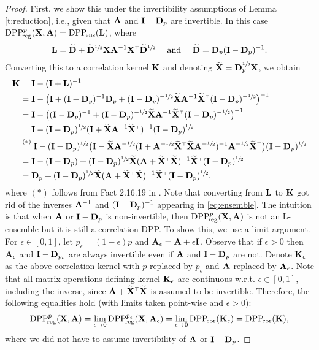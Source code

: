 \documentclass[11pt]{article}
\begin{document}
  \begin{proof}
    First, we show this under the invertibility assumptions of Lemma
    \ref{t:reduction}, i.e., given that $\mathbf A$ and $\mathbf I-\mathbf D_p$ are
    invertible. In this case ${{\mathrm{DPP}}_{\!\mathrm{reg}}^{p}}(\mathbf X,\mathbf A)={{\mathrm{DPP}}_{\!\mathrm{ens}}}(\mathbf{L})$, where
    \begin{align}\L=\Dbt+
    \Dbt^{\sfrac12}\X\A^{-1}\X^\top
      \Dbt^{\sfrac12}\quad\text{ and }\quad\Dbt=\D_p(\I-\D_p)^{-1}.\label{eq:ensemble}
\end{align}
Converting this to
    a correlation kernel $\mathbf K$ and denoting $\widetilde{\mathbf{X}}=\mathbf D_p^{\sfrac12}\mathbf X$, we obtain
    \begin{align*}
      \K&=\I-(\I+\L)^{-1}
\\      &=\I - \big(\I + (\I-\D_p)^{-1}\D_p +
(\I-\D_p)^{-\sfrac12}\Xt\A^{-1}\Xt^\top(\I-\D_p)^{-\sfrac12}\big)^{-1}
\\ &= \I - \big((\I-\D_p)^{-1} +
     (\I-\D_p)^{-\sfrac12}\Xt\A^{-1}\Xt^\top(\I-\D_p)^{-\sfrac12}\big)^{-1}
\\ &=\I -
     (\I-\D_p)^{\sfrac12}(\I+\Xt\A^{-1}\Xt^\top)^{-1}(\I-\D_p)^{\sfrac12}
      \\
      &\overset{(*)}{=}\I -
     (\I-\D_p)^{\sfrac12}\big(\I-\Xt\A^{-\sfrac12}
     (\I+\A^{-\sfrac12}\Xt^\top\Xt\A^{-\sfrac12})^{-1}
     \A^{-\sfrac12}\Xt^\top\big)(\I-\D_p)^{\sfrac12}
      \\
      &=\I - (\I-\D_p) +
     (\I-\D_p)^{\sfrac12}\Xt(\A+\Xt^\top\Xt)^{-1}\Xt^\top(\I-\D_p)^{\sfrac12}
\\ &=\D_p + (\I-\D_p)^{\sfrac12}\Xt(\A+\Xt^\top\Xt)^{-1}\Xt^\top(\I-\D_p)^{\sfrac12},
    \end{align*}
    where $(*)$ follows from Fact 2.16.19 in
    \cite{matrix-mathematics}. Note that converting from $\mathbf{L}$ to $\mathbf K$
    got rid of the inverses $\mathbf A^{-1}$  and $(\mathbf I-\mathbf D_p)^{-1}$ appearing
    in \eqref{eq:ensemble}. The intuition 
    is that when $\mathbf A$ or $\mathbf I-\mathbf D_p$ is non-invertible, then
    ${{\mathrm{DPP}}_{\!\mathrm{reg}}^{p}}(\mathbf X,\mathbf A)$ is not an L-ensemble but it is still a
    correlation DPP. To show this, we use a limit argument. For
    $\epsilon\in[0,1]$, let $p_\epsilon=(1-\epsilon)p$ and
    $\mathbf A_\epsilon=\mathbf A+\epsilon\mathbf I$. Observe that if $\epsilon>0$ then $\mathbf A_\epsilon$ and
    $\mathbf I-\mathbf D_{p_{\epsilon}}$ are always invertible even if $\mathbf A$ and
    $\mathbf I-\mathbf D_p$ are not. Denote $\mathbf K_\epsilon$ as the
    above correlation kernel with $p$ replaced by $p_{\epsilon}$ and
    $\mathbf A$ replaced by $\mathbf A_{\epsilon}$. Note that all matrix operations
    defining kernel $\mathbf K_\epsilon$ are continuous w.r.t. $\epsilon\in[0,1]$, including the inverse, since
    $\A+\Xt^\top\Xt$ is assumed to be invertible. Therefore, the
    following equalities hold (with limits taken point-wise and $\epsilon>0$):
    \begin{align*}
      {{\mathrm{DPP}}_{\!\mathrm{reg}}^{p}}(\mathbf X,\mathbf A) = \lim_{\epsilon\rightarrow
      0}{{\mathrm{DPP}}_{\!\mathrm{reg}}^{p_\epsilon}}(\mathbf X,\mathbf A_{\epsilon}) =
      \lim_{\epsilon\rightarrow 0}{{\mathrm{DPP}}_{\!\mathrm{cor}}}(\mathbf K_\epsilon) = {{\mathrm{DPP}}_{\!\mathrm{cor}}}(\mathbf K),
    \end{align*}
where we did not have to assume invertibility of $\mathbf A$ or $\mathbf I-\mathbf D_p$.
\end{proof}
\end{document}
